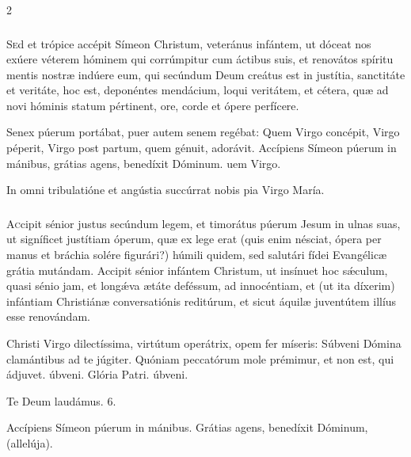 \documentclass[9pt,twoside]{extarticle}
\begin{document}
\begin{multicols}{2}
\subsubsection*{\center{}}
\lettrine{S}ed et trópice accépit Símeon Christum, veteránus infántem, ut dóceat nos exúere véterem hóminem qui corrúmpitur cum áctibus suis, et renovátos spíritu mentis nostræ indúere eum, qui secúndum Deum creátus est in justítia, sanctitáte et veritáte, hoc est, deponéntes mendácium, loqui veritátem, et cétera, quæ ad novi hóminis statum pértinent, ore, corde et ópere perfícere.

\begin{tightlist}{}
\item {} Senex púerum portábat, puer autem senem regébat: \textred{*} Quem Virgo concépit, Virgo péperit, Virgo post partum, quem génuit, adorávit.  Accípiens Símeon púerum in mánibus, grátias agens, benedíxit Dóminum. uem Virgo.
\item {\small {} In omni tribulatióne et angústia succúrrat nobis pia Virgo María.}
\end{tightlist}

\subsubsection*{\center{}}
\lettrine{A}ccipit sénior justus secúndum legem, et timorátus púerum Jesum in ulnas suas, ut signíficet justítiam óperum, quæ ex lege erat (quis enim nésciat, ópera per manus et bráchia solére figurári?) húmili quidem, sed salutári fídei Evangélicæ grátia mutándam. Accipit sénior infántem Christum, ut insínuet hoc sǽculum, quasi sénio jam, et longǽva ætáte deféssum, ad innocéntiam, et (ut ita díxerim) infántiam Christiánæ conversatiónis reditúrum, et sicut áquilæ juventútem illíus esse renovándam. 

\begin{tightlist}{}
\item {} Christi Virgo dilectíssima, virtútum operátrix, opem fer míseris: \textred{*} Súbveni Dómina clamántibus ad te júgiter.  Quóniam peccatórum mole prémimur, et non est, qui ádjuvet. úbveni. Glória Patri. úbveni.
\item Te Deum laudámus. 6.
\item {} Accípiens Símeon púerum in mánibus.  Grátias agens, benedíxit Dóminum, (allelúja). 
\end{tightlist}


\end{multicols}
\end{document}
